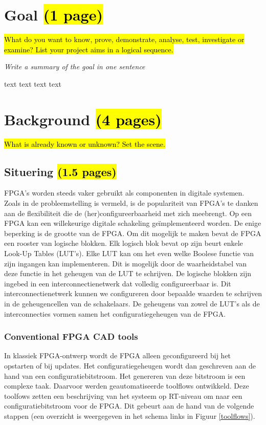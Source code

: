 \documentclass[a4paper,oneside,12pt]{article}
\begin{document}
\newpage

\section{Goal \hl{(1 page)}}
\hl{What do you want to know, prove, demonstrate, analyse, test, investigate or examine? List your project aims in a logical sequence.}


\emph{Write a summary of the goal in one sentence}

text
text 
text
text


\newpage

\section{Background \hl{(4 pages)}}
\hl{What is already known or unknown? Set the scene.}

\subsection{Situering \hl{(1.5 pages)}}

FPGA's worden steeds vaker gebruikt als componenten in digitale systemen. Zoals in de probleemstelling is vermeld, is de populariteit van FPGA's te danken aan de flexibiliteit die de (her)configureerbaarheid met zich meebrengt. Op een FPGA kan een willekeurige digitale schakeling ge\"implementeerd worden. De enige beperking is de grootte van de FPGA. Om dit mogelijk te maken bevat de FPGA een rooster van logische blokken. Elk logisch blok bevat op zijn beurt enkele Look-Up Tables (LUT's). Elke LUT kan om het even welke Boolese functie van zijn ingangen kan implementeren. Dit is mogelijk door de waarheidstabel van deze functie in het geheugen van de LUT te schrijven. De logische blokken zijn ingebed in een interconnectienetwerk dat volledig configureerbaar is. Dit interconnectienetwerk kunnen we configureren door bepaalde waarden te schrijven in de geheugencellen van de schakelaars. De geheugens van zowel de LUT's als de interconnecties vormen samen het configuratiegeheugen van de FPGA. 

\subsubsection{Conventional FPGA CAD tools}
In klassiek FPGA-ontwerp wordt de FPGA alleen geconfigureerd bij het opstarten of bij updates. Het configuratiegeheugen wordt dan geschreven aan de hand van een configuratiebitstroom. Het genereren van deze bitstroom is een complexe taak. Daarvoor werden geautomatiseerde toolflows ontwikkeld. Deze toolfows zetten een beschrijving van het systeem op RT-niveau om naar een configuratiebitstroom voor de FPGA. Dit gebeurt aan de hand van de volgende stappen (een overzicht is weergegeven in het schema links in Figuur \ref{toolflows}).
\end{document}
